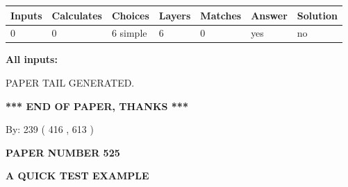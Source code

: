 \documentclass[12pt]{article}
\begin{document}
 
\noindent{}
 
 
   
   
   
   
\noindent\begin{tabular}{|l|l|l|l|l|l|l|}
 \hline
Inputs & Calculates & Choices & Layers & Matches & Answer & Solution \\ \hline
 0  & 
 0  & 
 6
  simple  
  & 
 6  & 
 0  & 
  yes & 
  no 
  \\ \hline
 \end{tabular}
   
   
   
   
\noindent{}
   
   
   
   
\noindent\vspace{0.1in}\hspace{-0.08in} {\textbf{\Large{All inputs: }}}
   
   
   
   
   
   
 \vspace{0.2in}
 
   
   
\vspace{2.0in} PAPER TAIL GENERATED.
   
   
   
   
\vspace{1.0in} 
{\textbf{\large{ *** END OF PAPER, THANKS *** }}} 
   
   
\hspace{1.0in} By: 
 239 ( 416 ,  613 )
   
   
   
   
\newpage 
\setcounter{page}{ 
   525001 } 
   
   
   
   
 {\textbf{ \Large{ PAPER NUMBER  525  }}}
   
   
\vspace{0.2in}
   
   
   
   
   
   
   
   
 \vspace{0.2in}
{\LARGE {\textbf{ A QUICK TEST EXAMPLE}}}
   
\end{document}
